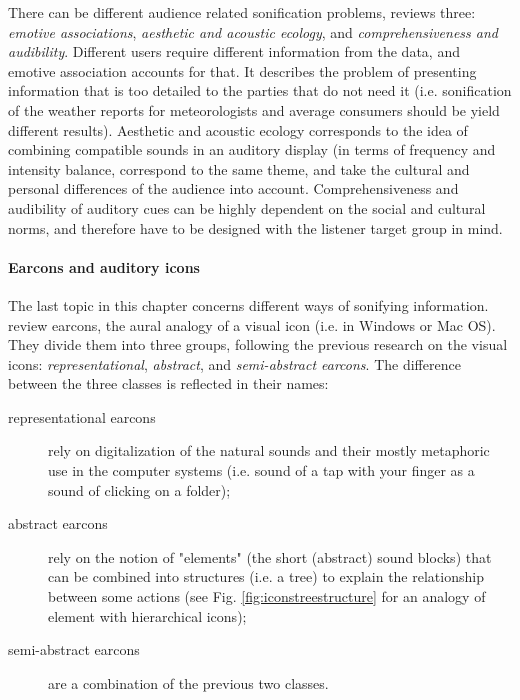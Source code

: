 There can be different audience related sonification problems, \cite{hermann_sonification_2011} reviews three: \textit{emotive associations}, \textit{aesthetic and acoustic ecology}, and \textit{comprehensiveness and audibility}. Different users require different information from the data, and emotive association accounts for that. It describes the problem of presenting information that is too detailed to the parties that do not need it (i.e. sonification of the weather reports for meteorologists and average consumers should be yield different results). Aesthetic and acoustic ecology corresponds to the idea of combining compatible sounds in an auditory display (in terms of frequency and intensity balance, correspond to the same theme, and take the cultural and personal differences of the audience into account. Comprehensiveness and audibility of auditory cues can be highly dependent on the social and cultural norms, and therefore have to be designed with the listener target group in mind.

\paragraph[]{Earcons and auditory icons}
The last topic in this chapter concerns different ways of sonifying information. \cite{blattner_earcons_1989} review earcons, the aural analogy of a visual icon (i.e. in Windows or Mac OS). They divide them into three groups, following the previous research on the visual icons: \textit{representational}, \textit{abstract}, and \textit{semi-abstract earcons}. 
The difference between the three classes is reflected in their names:
\begin{description}
	\item[representational earcons] rely on digitalization of the natural sounds and their mostly metaphoric use in the computer systems (i.e. sound of a tap with your finger as a sound of clicking on a folder);
	
	\item[abstract earcons] rely on the notion of "elements" (the short (abstract) sound blocks) that can be combined into structures (i.e. a tree) to explain the relationship between some actions (see Fig. \ref{fig:iconstreestructure} for an analogy of element with hierarchical icons);
	
	\item[semi-abstract earcons] are a combination of the previous two classes.
\end{description}

